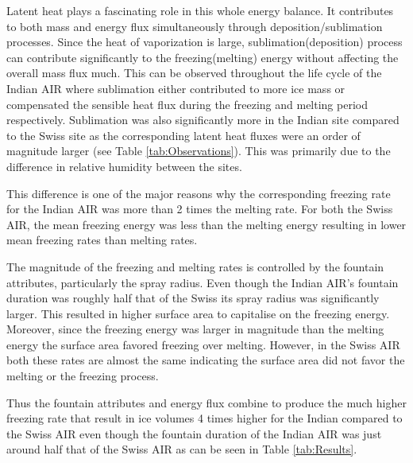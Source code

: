 \documentclass[utf8]{frontiersSCNS} %
\begin{document}
Latent heat plays a fascinating role in this whole energy balance. It contributes to both mass and energy flux
simultaneously through deposition/sublimation processes. Since the heat of vaporization is large,
sublimation(deposition) process can contribute significantly to the freezing(melting) energy without affecting the
overall mass flux much. This can be observed throughout the life cycle of the Indian AIR where sublimation either
contributed to more ice mass or compensated the sensible heat flux during the freezing and melting period respectively.
Sublimation was also significantly more in the Indian site compared to the Swiss site as the corresponding latent heat
fluxes were an order of magnitude larger (see Table \ref{tab:Observations}). This was primarily due to the difference in
relative humidity between the sites. 

This difference is one of the major reasons why the corresponding freezing rate for the Indian AIR was more than 2 times
the melting rate. For both the Swiss AIR, the mean freezing energy was less than the melting energy resulting in
lower mean freezing rates than melting rates.  

The magnitude of the freezing and melting rates is controlled by the fountain attributes, particularly the spray radius.
Even though the Indian AIR's fountain duration was roughly half that of the Swiss its spray radius was significantly
larger. This resulted in higher surface area to capitalise on the freezing energy. Moreover, since the freezing energy
was larger in magnitude than the melting energy the surface area favored freezing over melting. However, in the Swiss
AIR both these rates are almost the same indicating the surface area did not favor the melting or the freezing process.  

Thus the fountain attributes and energy flux combine to produce the much higher freezing rate that result in ice volumes
4 times higher for the Indian compared to the Swiss AIR even though the fountain duration of the Indian AIR was just
around half that of the Swiss AIR as can be seen in Table \ref{tab:Results}. 
\end{document}
